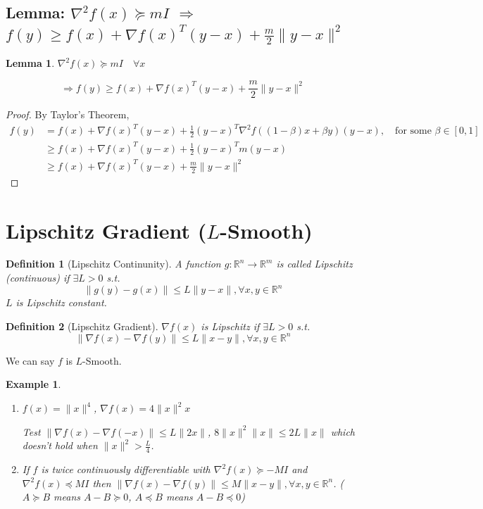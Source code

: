 \documentclass[11pt,a4paper]{article}
\newtheorem{lemma}{Lemma}
\newtheorem{example}{Example}
\newtheorem{definition}{Definition}
\begin{document}
\subsection{Lemma: $\nabla^2 f(x)\succeq mI$ $\Rightarrow$ $f(y)\geq f(x)+\nabla f(x)^T(y-x)+\frac{m}{2}\|y-x\|^2$}
\begin{lemma}
$\nabla^2 f(x)\succeq mI\quad \forall x$

$$\Rightarrow f(y)\geq f(x)+\nabla f(x)^T(y-x)+\frac{m}{2}\|y-x\|^2$$
\end{lemma}
\begin{proof}
    By Taylor's Theorem,
    \begin{equation}
        \begin{aligned}
            f(y)&=f(x)+\nabla f(x)^T(y-x)+\frac{1}{2}(y-x)^T \nabla^2 f((1-\beta)x+\beta y)(y-x),\quad \text{for some }\beta\in[0,1]\\
            &\geq f(x)+\nabla f(x)^T(y-x)+\frac{1}{2}(y-x)^Tm(y-x)\\
            &\geq f(x)+\nabla f(x)^T(y-x)+\frac{m}{2}\|y-x\|^2
        \end{aligned}
        \nonumber
    \end{equation}
\end{proof}



\section{Lipschitz Gradient ($L$-Smooth)}
\begin{definition}[Lipschitz Continunity]
A function $g: \mathbb{R}^n \rightarrow	\mathbb{R}^m$ is called Lipschitz (continuous) if $\exists L>0$ s.t.
$$\|g(y)-g(x)\|\leq L\|y-x\|,\forall x,y\in \mathbb{R}^n$$
$L$ is Lipschitz constant.
\end{definition}

\begin{definition}[Lipschitz Gradient]
    $\nabla f(x)$ is Lipschitz if $\exists L>0$ s.t. $$\|\nabla f(x)-\nabla f(y)\|\leq L\|x-y\|,\forall x,y\in \mathbb{R}^n$$
\end{definition}
We can say $f$ is $L$-Smooth.

\begin{example}
    \quad

\begin{enumerate}
    \item $f(x)=\|x\|^4$, $\nabla f(x)=4\|x\|^2x$
    
    Test $\|\nabla f(x)-\nabla f(-x)\|\leq L\|2x\|$, $8\|x\|^2\|x\|\leq 2L\|x\|$ which doesn't hold when $\|x\|^2>\frac{L}{4}$.
    \item If $f$ is twice continuously differentiable with $\nabla^2 f(x)\succeq -MI$ and $\nabla^2 f(x)\preceq  MI$ then $\|\nabla f(x)-\nabla f(y)\|\leq M\|x-y\|,\forall x,y\in \mathbb{R}^n$. ($A\succeq B$ means $A-B\succeq 0$, $A\preceq B$ means $A-B\preceq 0$)
\end{enumerate}
\end{example}
\end{document}
